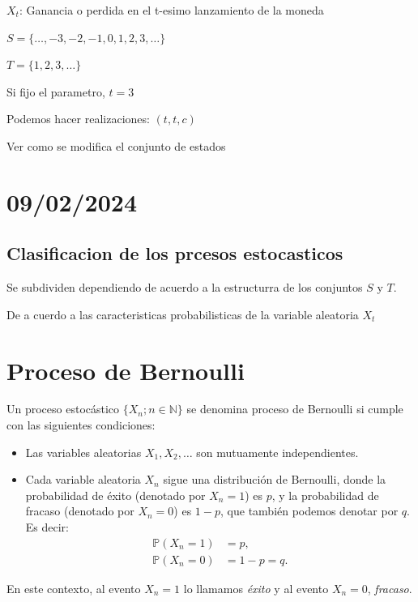 \documentclass{article}
\begin{document}
$X_t$: Ganancia o perdida en el t-esimo lanzamiento de la moneda

$S = \{\dots, -3,-2,-1, 0, 1, 2, 3, \dots\}$

$T = \{1,2,3,\dots\}$

Si fijo el parametro, $t = 3$

Podemos hacer realizaciones: $(t,t,c)$

Ver como se modifica el conjunto de estados

\section{09/02/2024}

\subsection{Clasificacion de los prcesos estocasticos}

Se subdividen dependiendo de acuerdo a la estructurra de los conjuntos $S$ y $T$.

De a cuerdo a las caracteristicas probabilisticas de la variable aleatoria $X_t$

\newpage

\section{Proceso de Bernoulli}

Un proceso estocástico $\{X_n; n \in \mathbb{N}\}$ se denomina proceso de Bernoulli si cumple con las siguientes condiciones:

\begin{itemize}
    \item Las variables aleatorias $X_1, X_2, \ldots$ son mutuamente independientes.
    \item Cada variable aleatoria $X_n$ sigue una distribución de Bernoulli, donde la probabilidad de éxito (denotado por $X_n = 1$) es $p$, y la probabilidad de fracaso (denotado por $X_n = 0$) es $1-p$, que también podemos denotar por $q$. Es decir:
          \begin{align*}
              \mathbb{P}(X_n = 1) & = p,       \\
              \mathbb{P}(X_n = 0) & = 1-p = q.
          \end{align*}
\end{itemize}

En este contexto, al evento $X_n = 1$ lo llamamos \textit{éxito} y al evento $X_n = 0$, \textit{fracaso}.
\end{document}
